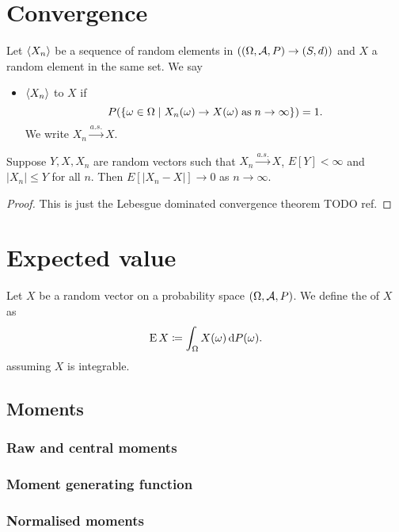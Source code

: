 \section{Convergence}
\begin{definition}
Let $\left\langle X_n \right\rangle$ be a sequence of random elements in $(\left( \Omega, \mathcal{A}, P \right) \to \left( S,d \right))$ and $X$ a random element in the same set. We say
\begin{itemize}
\item $\left\langle X_n \right\rangle$  to $X$ if
\[ P(\left\{ \omega\in\Omega \;\middle|\; X_n(\omega) \to X(\omega)\;\text{as}\; n\to \infty \right\}) = 1. \]
We write $X_n \overset{a.s.}{\longrightarrow} X$.
\end{itemize}
\end{definition}

\begin{lemma}
Suppose $Y,X,X_n$ are random vectors such that $X_n \overset{a.s.}{\longrightarrow} X$, $E[Y]<\infty$ and $|X_n| \leq Y$ for all $n$. Then $E[|X_n -X|] \to 0$ as $n\to \infty$.
\end{lemma}
\begin{proof}
This is just the Lebesgue dominated convergence theorem TODO ref.
\end{proof}

\section{Expected value}
\begin{definition}
Let $X$ be a random  vector on a probability space $\left( \Omega, \mathcal{A}, P \right)$. We define the  of $X$ as
\[ \operatorname{E}{X} \coloneqq \int_\Omega X(\omega)\operatorname{d \!}{P(\omega)}. \]
assuming $X$ is integrable.
\end{definition}



\subsection{Moments}
\subsubsection{Raw and central moments}
\subsubsection{Moment generating function}
\subsubsection{Normalised moments}
